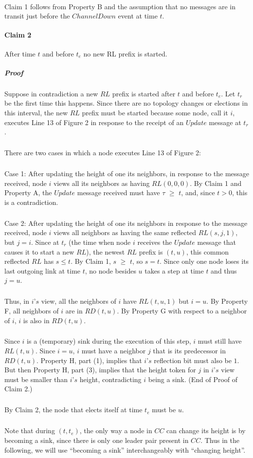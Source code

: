 \paragraph{}Claim 1 follows from Property B and the assumption that no messages are in transit just before the $ChannelDown$ event at time $t$. \paragraph{Claim 2}After time $t$ and before $t_e$ no new RL prefix is started.
\subparagraph{Proof}Suppose in contradiction a new $RL$ prefix is started after $t$ and before $t_e$. Let $t_r$ be the first time this happens. Since there are no topology changes or elections in this interval, the new $RL$ prefix must be started because some node, call it $i$, executes Line 13 of Figure 2 in response to the receipt of an $Update$ message at $t_r$.
\subparagraph{}There are two cases in which a node executes Line 13 of Figure 2:
\subparagraph{}Case 1: After updating the height of one its neighbors, in response to the message received, node $i$ views all its neighbors as having $RL (0, 0, 0)$. By Claim 1 and Property A, the $Update$ message received must have $\tau$ $\geq$ $t$, and, since $t > 0$, this is a contradiction.
\subparagraph{}Case 2: After updating the height of one its neighbors in response to the message received, node $i$ views all neighbors as having the same reflected $RL (s, j, 1)$, but $j = i$. Since at $t_r$ (the time when node $i$ receives the $Update$ message that causes it to start a new $RL$), the newest $RL$ prefix is $(t, u)$, this common reflected $RL$ has $s \leq t$. By Claim 1, $s$ $\geq$ $t$, so $s = t$. Since only one node loses its last outgoing link at time $t$, no node besides $u$ takes a step at time $t$ and thus $j = u$.
\subparagraph{}Thus, in $i’s$ view, all the neighbors of $i$ have $RL (t, u, 1)$ but $i = u$. By Property F, all neighbors of $i$ are in $RD(t, u)$. By Property G with respect to a neighbor of $i$, $i$ is also in $RD(t, u)$.
\subparagraph{}Since $i$ is a (temporary) sink during the execution of this step, $i$ must still have $RL (t, u)$. Since $i = u$, $i$ must have a neighbor $j$ that is its predecessor in $RD(t, u)$. Property H, part (1), implies that $i’s$ reflection bit must also be $1$. But then Property H, part (3), implies that the height token for $j$ in $i’s$ view must be smaller than $i’s$ height, contradicting $i$ being a sink. (End of Proof of Claim 2.)
\subparagraph{}By Claim 2, the node that elects itself at time $t_e$ must be $u$.
\subparagraph{}Note that during $(t,t_e)$, the only way a node in $CC$ can change its height is by becoming a sink, since there is only one leader pair present in $CC$. Thus in the following, we will use “becoming a sink” interchangeably with “changing height”.
